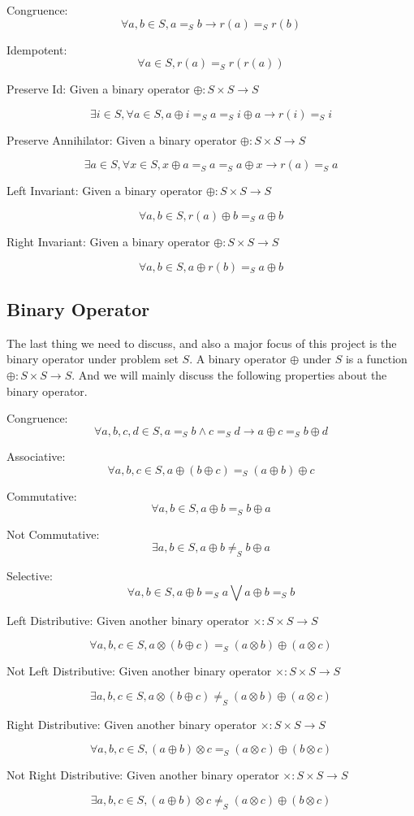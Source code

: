 \documentclass[a4paper,12pt,twoside,openright]{report}
\newcommand{\e}[2]{
\begin{equation}
  \label{#1} 
  #2
\end{equation}
}
\begin{document}
Congruence: \e{def:uop:congruence}{\forall a,b \in S, a =_S b \rightarrow r(a) =_S r(b)}
Idempotent: \e{def:uop:idempotent}{\forall a \in S, r(a) =_S r(r(a))}
Preserve Id: Given a binary operator $\oplus : S \times S \rightarrow S$
\e{def:uop:preserve_id}{\exists i \in S, \forall a \in S, a \oplus i =_S a =_S i \oplus a \rightarrow r(i) =_S i}
Preserve Annihilator: Given a binary operator $\oplus : S \times S \rightarrow S$
\e{def:uop:preserve_ann}{\exists a \in S, \forall x \in S, x \oplus a =_S a =_S a \oplus x \rightarrow r(a) =_S a}
Left Invariant: Given a binary operator $\oplus : S \times S \rightarrow S$
\e{def:uop:left_invariant}{\forall a,b \in S, r(a) \oplus b =_S a \oplus b}
Right Invariant: Given a binary operator $\oplus : S \times S \rightarrow S$
\e{def:uop:right_invariant}{\forall a,b \in S, a \oplus r(b) =_S a \oplus b}

\subsection{Binary Operator}
The last thing we need to discuss, and also a major focus of this project is the binary operator under problem set $S$. A binary operator $\oplus$ under $S$ is a function $\oplus : S \times S \rightarrow S$. And we will mainly discuss the following  properties about the binary operator.

Congruence: \e{def:bop:congruence}{\forall a,b,c,d \in S, a =_S b \wedge c =_S d \rightarrow a \oplus c =_S b \oplus d}
Associative: \e{def:bop:associative}{\forall a,b,c \in S, a \oplus (b \oplus c) =_S (a \oplus b) \oplus c}
Commutative: \e{def:bop:commutative}{\forall a,b \in S, a \oplus b =_S b \oplus a}
Not Commutative: \e{def:bop:not_commutative}{\exists a,b \in S, a \oplus b \neq_S b \oplus a}
Selective: \e{def:bop:selective}{\forall a,b \in S, a \oplus b =_S a \bigvee a \oplus b =_S b}
Left Distributive: Given another binary operator $\times : S \times S \rightarrow S$
\e{def:bop:left_distributive}{\forall a,b,c \in S, a \otimes (b \oplus c) =_S (a \otimes b) \oplus (a \otimes c)}
Not Left Distributive: Given another binary operator $\times : S \times S \rightarrow S$
\e{def:bop:not_left_distributive}{\exists a,b,c \in S, a \otimes (b \oplus c) \neq_S (a \otimes b) \oplus (a \otimes c)}
Right Distributive: Given another binary operator $\times : S \times S \rightarrow S$
\e{def:bop:right_distributive}{\forall a,b,c \in S, (a \oplus b) \otimes c =_S (a \otimes c) \oplus (b \otimes c)}
Not Right Distributive: Given another binary operator $\times : S \times S \rightarrow S$
\e{def:bop:not_right_distributive}{\exists a,b,c \in S, (a \oplus b) \otimes c \neq_S (a \otimes c) \oplus (b \otimes c)}
\end{document}
